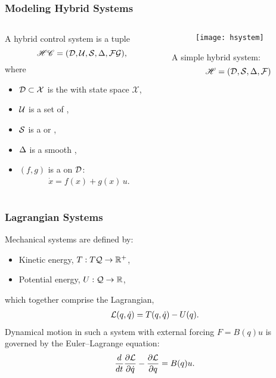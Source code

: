 \begin{frame}
  \frametitle{Modeling Hybrid Systems}
  \begin{columns}
    \begin{column}{.63\textwidth}
      \begin{definition}
        A \alert{hybrid control system} is a tuple \vspace{-.3cm}
        $$\HCS = \hcsystem, \vspace{-.4cm}$$
        where
        \begin{itemize}
        \item
          $\mathcal{D} \subset \mathcal{X}$ is the  with state space $\mathcal{X}$,
        \item
          $\mathcal{U}$ is a set of ,
        \item
          $\mathcal{S}$ is a  or ,
        \item
          $\Delta$ is a smooth ,
        \item
          $(f, g)$ is a  on $\mathcal{D}$: \vspace{-3mm}
          \begin{align*}
            \dot{x} = f(x) + g(x) \, u.
          \end{align*}
        \end{itemize}
      \end{definition}
    \end{column}
    \begin{column}{.4\textwidth}
      \begin{figure}
        \centering
        \texttt{[image: hsystem]}\\
      \end{figure}
      A \alert{simple hybrid system}:\vspace{-.3cm}
      $$\mathscr{H} = (\mathcal{D}, \mathcal{S}, \Delta, \mathcal{F})$$
    \end{column}
  \end{columns}
\end{frame}

\begin{frame}
  \frametitle{Lagrangian Systems}
  Mechanical systems are defined by:
  \begin{itemize}
  \item Kinetic energy, $T : T\mathcal{Q} \to \mathbb{R}^+$,\\
  \item Potential energy, $U : \mathcal{Q} \to \mathbb{R}$,
  \end{itemize}
  which together comprise the Lagrangian,
  \begin{align*}
    \mathcal{L}(q, \dot q) = T(q, \dot q) - U(q).
  \end{align*}
  Dynamical motion in such a system with external forcing $F = B(q) u$ is governed by the Euler--Lagrange equation:
  \begin{align*}
    \frac{d}{dt} \frac{\partial{\ensuremath{\mathcal{L}}}}{\partial{\ensuremath{\dot q}}} - \frac{\partial{\ensuremath{\mathcal{L}}}}{\partial{\ensuremath{q}}} = B(q) u.
  \end{align*}
\end{frame}


